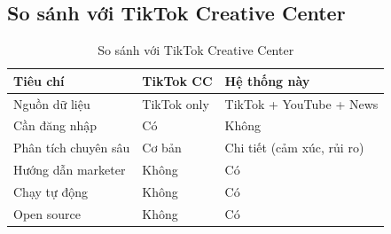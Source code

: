\subsection{So sánh với TikTok Creative Center}

\begin{table}[H]
    \centering
    \begin{tabular}{|l|l|l|}
    \hline
    \textbf{Tiêu chí} & \textbf{TikTok CC} & \textbf{Hệ thống này} \\
    \hline
    Nguồn dữ liệu & TikTok only & TikTok + YouTube + News \\
    Cần đăng nhập & Có & Không \\
    Phân tích chuyên sâu & Cơ bản & Chi tiết (cảm xúc, rủi ro) \\
    Hướng dẫn marketer & Không & Có \\
    Chạy tự động & Không & Có \\
    Open source & Không & Có \\
    \hline
    \end{tabular}
    \caption{So sánh với TikTok Creative Center}
    \label{table:comparison_tiktok}
\end{table}


